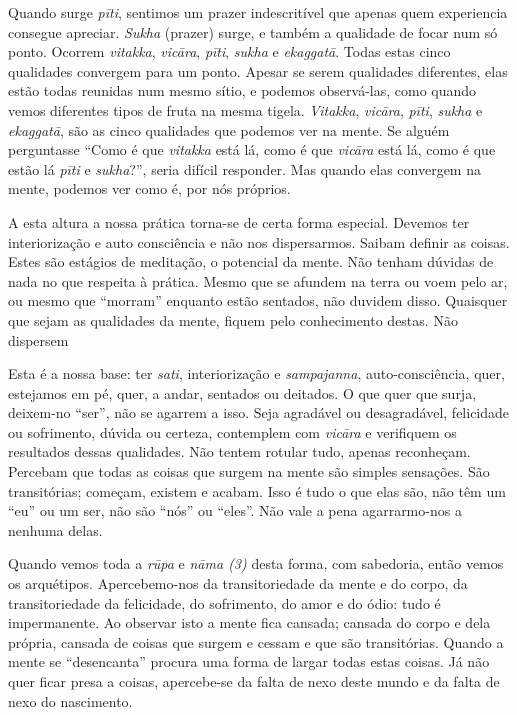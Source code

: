 Quando surge \emph{pīti}, sentimos um prazer indescritível que apenas
quem experiencia consegue apreciar. \emph{Sukha} (prazer) surge, e
também a qualidade de focar num só ponto. Ocorrem \emph{vitakka},
\emph{vicāra}, \emph{pīti}, \emph{sukha} e \emph{ekaggatā}. Todas estas
cinco qualidades convergem para um ponto. Apesar se serem qualidades
diferentes, elas estão todas reunidas num mesmo sítio, e podemos
observá-las, como quando vemos diferentes tipos de fruta na mesma
tigela. \emph{Vitakka}, \emph{vicāra}, \emph{pīti}, \emph{sukha} e
\emph{ekaggatā}, são as cinco qualidades que podemos ver na mente. Se
alguém perguntasse ``Como é que \emph{vitakka} está lá, como é que
\emph{vicāra} está lá, como é que estão lá \emph{pīti} e
\emph{sukha}?'', seria difícil responder. Mas quando elas convergem na
mente, podemos ver como é, por nós próprios.

A esta altura a nossa prática torna-se de certa forma especial. Devemos
ter interiorização e auto consciência e não nos dispersarmos. Saibam
definir as coisas. Estes são estágios de meditação, o potencial da
mente. Não tenham dúvidas de nada no que respeita à prática. Mesmo que
se afundem na terra ou voem pelo ar, ou mesmo que ``morram'' enquanto
estão sentados, não duvidem disso. Quaisquer que sejam as qualidades da
mente, fiquem pelo conhecimento destas. Não dispersem

Esta é a nossa base: ter \emph{sati}, interiorização e
\emph{sampajanna}, auto-consciência, quer, estejamos em pé, quer, a
andar, sentados ou deitados. O que quer que surja, deixem-no ``ser'',
não se agarrem a isso. Seja agradável ou desagradável, felicidade ou
sofrimento, dúvida ou certeza, contemplem com \emph{vicāra} e verifiquem
os resultados dessas qualidades. Não tentem rotular tudo, apenas
reconheçam. Percebam que todas as coisas que surgem na mente são simples
sensações. São transitórias; começam, existem e acabam. Isso é tudo o
que elas são, não têm um ``eu'' ou um ser, não são ``nós'' ou ``eles''.
Não vale a pena agarrarmo-nos a nenhuma delas.

Quando vemos toda a \emph{rūpa} e \emph{nāma (3)} desta forma, com
sabedoria, então vemos os arquétipos. Apercebemo-nos da transitoriedade
da mente e do corpo, da transitoriedade da felicidade, do sofrimento, do
amor e do ódio: tudo é impermanente. Ao observar isto a mente fica
cansada; cansada do corpo e dela própria, cansada de coisas que surgem e
cessam e que são transitórias. Quando a mente se ``desencanta'' procura
uma forma de largar todas estas coisas. Já não quer ficar presa a
coisas, apercebe-se da falta de nexo deste mundo e da falta de nexo do
nascimento.

